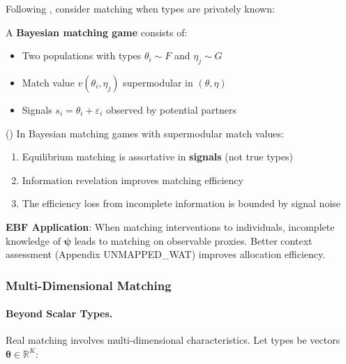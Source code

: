 Following \citet{johnson2019matching}, consider matching when types are privately known:

\begin{definition}
\label{def:bayesian-matching}
A \textbf{Bayesian matching game} consists of:
\begin{itemize}
    \item Two populations with types $\theta_i \sim F$ and $\eta_j \sim G$
    \item Match value $v(\theta_i, \eta_j)$ supermodular in $(\theta, \eta)$
    \item Signals $s_i = \theta_i + \varepsilon_i$ observed by potential partners
\end{itemize}
\end{definition}

\begin{theorem}
\label{thm:uncertain-matching}
\textup{(\citet{johnson2019matching})}
In Bayesian matching games with supermodular match values:
\begin{enumerate}
    \item Equilibrium matching is assortative in \textbf{signals} (not true types)
    \item Information revelation improves matching efficiency
    \item The efficiency loss from incomplete information is bounded by signal noise
\end{enumerate}
\end{theorem}

\textbf{EBF Application}: When matching interventions to individuals, incomplete 
knowledge of $\boldsymbol{\psi}$ leads to matching on observable proxies. Better 
context assessment (Appendix UNMAPPED_WAT) improves allocation efficiency.

\subsubsection{Multi-Dimensional Matching}

\paragraph{Beyond Scalar Types.}

Real matching involves multi-dimensional characteristics. Let types be vectors 
$\boldsymbol{\theta} \in \mathbb{R}^K$:

